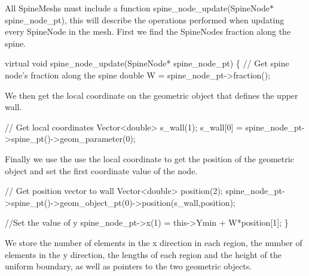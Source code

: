 All Spine\+Meshs must include a function {\ttfamily spine\+\_\+node\+\_\+update}(Spine\+Node$\ast$ spine\+\_\+node\+\_\+pt), this will describe the operations performed when updating every Spine\+Node in the mesh. First we find the Spine\+Nodes fraction along the spine.


\begin{DoxyCodeInclude}
 \textcolor{keyword}{virtual} \textcolor{keywordtype}{void} spine\_node\_update(SpineNode* spine\_node\_pt)
  \{
   \textcolor{comment}{// Get spine node's fraction along the spine}
   \textcolor{keywordtype}{double} W = spine\_node\_pt->fraction();

\end{DoxyCodeInclude}


We then get the local coordinate on the geometric object that defines the upper wall.


\begin{DoxyCodeInclude}
   
   \textcolor{comment}{// Get local coordinates}
   Vector<double> s\_wall(1);
   s\_wall[0] = spine\_node\_pt->spine\_pt()->geom\_parameter(0);

\end{DoxyCodeInclude}


Finally we use the use the local coordinate to get the position of the geometric object and set the first coordinate value of the node.


\begin{DoxyCodeInclude}
   
   \textcolor{comment}{// Get position vector to wall}
   Vector<double> position(2);
   spine\_node\_pt->spine\_pt()->geom\_object\_pt(0)->position(s\_wall,position);
     
   \textcolor{comment}{//Set the value of y}
   spine\_node\_pt->x(1) = this->Ymin + W*position[1];
  \}

\end{DoxyCodeInclude}


We store the number of elements in the x direction in each region, the number of elements in the y direction, the lengths of each region and the height of the uniform boundary, as well as pointers to the two geometric objects.


